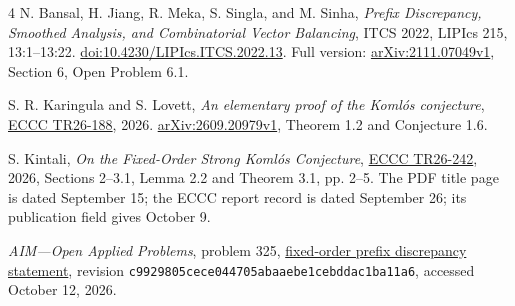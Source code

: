 \documentclass[11pt]{article}
\begin{document}
\begin{thebibliography}{4}
N. Bansal, H. Jiang, R. Meka, S. Singla, and M. Sinha,
\emph{Prefix Discrepancy, Smoothed Analysis, and Combinatorial Vector Balancing},
ITCS 2022, LIPIcs 215, 13:1--13:22.
\href{https://doi.org/10.4230/LIPIcs.ITCS.2022.13}{doi:10.4230/LIPIcs.ITCS.2022.13}.
Full version: \href{https://arxiv.org/abs/2111.07049v1}{arXiv:2111.07049v1},
Section 6, Open Problem 6.1.

S. R. Karingula and S. Lovett,
\emph{An elementary proof of the Koml\'os conjecture},
\href{https://eccc.weizmann.ac.il/report/2026/188/}{ECCC TR26-188}, 2026.
\href{https://arxiv.org/abs/2609.20979v1}{arXiv:2609.20979v1},
Theorem 1.2 and Conjecture 1.6.

S. Kintali, \emph{On the Fixed-Order Strong Koml\'os Conjecture},
\href{https://eccc.weizmann.ac.il/report/2026/242/}{ECCC TR26-242}, 2026,
Sections 2--3.1, Lemma 2.2 and Theorem 3.1, pp. 2--5.
The PDF title page is dated September 15; the ECCC report record is dated
September 26; its publication field gives October 9.

\emph{AIM---Open Applied Problems}, problem 325,
\href{https://github.com/MColbrook/AIM/blob/c9929805cece044705abaaebe1cebddac1ba11a6/problems/325-strong-komlos-prefix-discrepancy.md}{fixed-order prefix discrepancy statement},
revision \texttt{c9929805cece044705abaaebe1cebddac1ba11a6},
accessed October 12, 2026.
\end{thebibliography}
\end{document}
